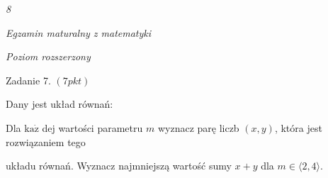 \documentclass[a4paper,12pt]{article}
\begin{document}
{\it 8}

{\it Egzamin maturalny z matematyki}

{\it Poziom rozszerzony}

Zadanie 7. $(7pkt)$

Dany jest układ równań: 

Dla $\mathrm{k}\mathrm{a}\dot{\mathrm{z}}$ dej wartości parametru $m$ wyznacz parę liczb $(x,y)$, która jest rozwiązaniem tego

układu równań. Wyznacz najmniejszą wartość sumy $x+y$ dla $m\in\langle 2,4\rangle.$
\end{document}
